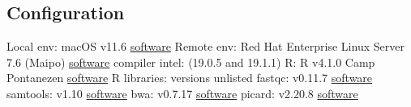 \markdownRendererUlEndTight \markdownRendererInterblockSeparator
{}\subsection{Configuration}\markdownRendererInterblockSeparator
{}\markdownRendererUlBegin
\markdownRendererUlItem Local env: macOS v11.6 \href{https://support.apple.com/macos}{software}\markdownRendererUlItemEnd 
\markdownRendererUlItem Remote env: Red Hat Enterprise Linux Server 7.6 (Maipo) \href{https://www.redhat.com/en/technologies/linux-platforms/enterprise-linux}{software}\markdownRendererUlItemEnd 
\markdownRendererUlItem compiler intel: (19.0.5 and 19.1.1)\markdownRendererUlItemEnd 
\markdownRendererUlItem R: R v4.1.0 Camp Pontanezen \href{https://www.r-project.org}{software}\markdownRendererUlItemEnd 
\markdownRendererUlItem R libraries: versions unlisted\markdownRendererUlItemEnd 
\markdownRendererUlItem fastqc: v0.11.7 \href{ }{software}\markdownRendererUlItemEnd 
\markdownRendererUlItem samtools: v1.10 \href{https://www.htslib.org}{software}\markdownRendererUlItemEnd 
\markdownRendererUlItem bwa: v0.7.17 \href{https://janis.readthedocs.io/en/latest/tools/bioinformatics/bwa/bwamem.html}{software}\markdownRendererUlItemEnd 
\markdownRendererUlItem picard: v2.20.8 \href{ }{software}\markdownRendererUlItemEnd 
\markdownRendererUlEnd \relax